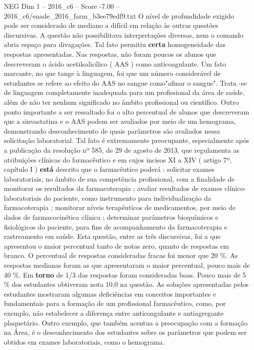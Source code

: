 \begin{textsample}{NEG Dim 1 – 2016\_c6 – Score -7.00 – 2016\_c6/enade\_2016\_farm\_b3ee79edf9.txt}
O nível de profundidade exigido pode ser considerado de mediano a difícil em relação às outras questões discursivas.
A questão não possibilitava interpretações diversas, nem o comando abria espaço para divagações.
Tal fato permitiu \textbf{certa} homogeneidade das respostas apresentadas.
Nas respostas, não foram poucos os alunos que descreveram o ácido acetilsalicílico ( AAS ) como anticoagulante.
Um fato marcante, no que tange à linguagem, foi que um número considerável de estudantes se refere ao efeito do AAS no sangue como"afinar o sangue".
Trata -se de linguagem completamente inadequada para um profissional da área de saúde, além de não ter nenhum significado no âmbito profissional ou científico.
Outro ponto importante a ser ressaltado foi o alto percentual de alunos que descreveram que a sinvastatina e o AAS podem ser avaliados por meio de um hemograma, demonstrando desconhecimento de quais parâmetros são avaliados nessa solicitação laboratorial.
Tal fato é extremamente preocupante, especialmente após a publicação da resolução nº 585, de 29 de agosto de 2013, que regulamenta as atribuições clínicas do farmacêutico e em cujos incisos XI a XIV ( artigo 7º, capítulo I ) \textbf{está} descrito que o farmacêutico poderá : solicitar exames laboratoriais, no âmbito de sua competência profissional, com a finalidade de monitorar os resultados da farmacoterapia ; avaliar resultados de exames clínico-laboratoriais do paciente, como instrumento para individualização da farmacoterapia ; monitorar níveis terapêuticos de medicamentos, por meio de dados de farmacocinética clínica ; determinar parâmetros bioquímicos e fisiológicos do paciente, para fins de acompanhamento da farmacoterapia e rastreamento em saúde.
Esta questão, entre as três discursivas, foi a que apresentou o maior percentual tanto de notas zero, quanto de respostas em branco.
O percentual de respostas consideradas fracas foi menor que 20 \%.
As respostas medianas foram as que apresentaram o maior percentual, pouco mais de 40 \%.
Em \textbf{torno} de 1/3 das respostas foram consideradas boas.
Pouco mais de 5 \% dos estudantes obtiveram nota 10,0 na questão.
As soluções apresentadas pelos estudantes mostraram algumas deficiências em conceitos importantes e fundamentais para a formação de um profissional farmacêutico, como, por exemplo, não estabelecer a diferença entre anticoagulante e antiagregante plaquetário.
Outro exemplo, que também acentua a preocupação com a formação na Área, é o desconhecimento dos estudantes sobre os parâmetros que podem ser obtidos em exames laboratoriais, como o hemograma.

\end{textsample}
